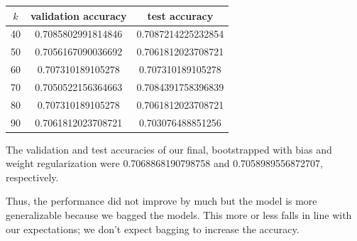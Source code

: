 \documentclass{article}
\begin{document}
\begin{enumerate}[label=\arabic*.]
        \begin{center}
            \begin{tabular}{c|c|c}
                $k$ & validation accuracy & test accuracy \\\hline
                40 & 0.7085802991814846 & 0.7087214225232854 \\
                50 & 0.7056167090036692 & 0.7061812023708721 \\
                60 & 0.707310189105278 & 0.707310189105278 \\
                70 & 0.7050522156364663 & 0.7084391758396839 \\
                80 & 0.707310189105278 & 0.7061812023708721 \\
                90 & 0.7061812023708721 & 0.703076488851256 \\
            \end{tabular}
        \end{center}
        The validation and test accuracies of our final, bootstrapped with bias and weight regularization were 0.7068868190798758 and 0.7058989556872707, respectively.

        Thus, the performance did not improve by much but the model is more generalizable because we bagged the models. This more or less falls in line with our expectations; we don't expect bagging to increase the accuracy. 
        


\end{enumerate}
\end{document}
